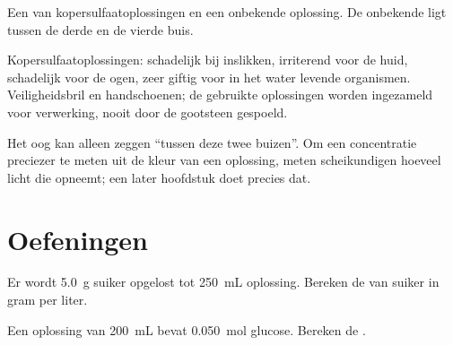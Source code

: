 \begin{omfigure}

{\small Een  van kopersulfaatoplossingen en een onbekende
oplossing. De onbekende ligt tussen de derde en de vierde buis.}
\end{omfigure}

\begin{safety}{}
Kopersulfaatoplossingen: schadelijk bij inslikken, irriterend voor de
huid, schadelijk voor de ogen, zeer giftig voor in het water levende
organismen. Veiligheidsbril en handschoenen; de gebruikte oplossingen
worden ingezameld voor verwerking, nooit door de gootsteen gespoeld.
\end{safety}

\begin{remark}\label{rem:g10:concentration-and-dilution:eye}
Het oog kan alleen zeggen ``tussen deze twee buizen''. Om een
concentratie preciezer te meten uit de kleur van een oplossing, meten
scheikundigen hoeveel licht die opneemt; een later hoofdstuk doet precies
dat.
\end{remark}

\section{Oefeningen}

\begin{exercise}[$\star$]\label{exo:g10:concentration-and-dilution:1}
Er wordt \qty{5.0}{g} suiker opgelost tot \qty{250}{mL} oplossing.
Bereken de  van suiker in gram per liter.
\end{exercise}

\begin{exercise}[$\star$]\label{exo:g10:concentration-and-dilution:2}
Een oplossing van \qty{200}{mL} bevat \qty{0.050}{mol} glucose. Bereken
de .
\end{exercise}

